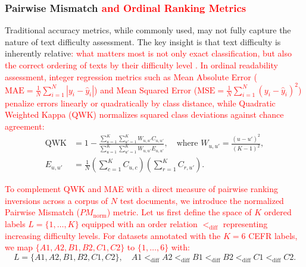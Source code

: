 \subsubsection{Pairwise Mismatch \textcolor{red}{and Ordinal Ranking Metrics}}
Traditional accuracy metrics, while commonly used, may not fully capture the nature of text difficulty assessment. The key insight is that text difficulty is inherently relative\textcolor{red}{: what matters most is not only exact classification, but also the correct ordering of texts by their difficulty level \cite{martinc2021supervised}. In ordinal readability assessment, integer regression metrics such as Mean Absolute Error ($\text{MAE} = \frac{1}{N}\sum_{i=1}^N |y_i - \hat{y}_i|$) and Mean Squared Error ($\text{MSE} = \frac{1}{N}\sum_{i=1}^N (y_i - \hat{y}_i)^2$) penalize errors linearly or quadratically by class distance, while Quadratic Weighted Kappa (QWK) \cite{martinc2021supervised} normalizes squared class deviations against chance agreement:}
{\color{red}\begin{equation}
\begin{aligned}
\text{QWK} &= 1 - \frac{\sum_{u=1}^{K}\sum_{u'=1}^{K} W_{u,u'} C_{u,u'}}{\sum_{u=1}^{K}\sum_{u'=1}^{K} W_{u,u'} E_{u,u'}}, \quad \text{where } W_{u,u'} = \frac{(u - u')^2}{(K - 1)^2}, \\
E_{u,u'} &= \frac{1}{N}\left(\sum_{c=1}^{K} C_{u,c}\right)\left(\sum_{r=1}^{K} C_{r,u'}\right).
\end{aligned}
\label{eq:qwk_definition}
\end{equation}}

\textcolor{red}{To complement QWK and MAE with a direct measure of pairwise ranking inversions across a corpus of $N$ test documents, we introduce the normalized Pairwise Mismatch ($PM_{\text{norm}}$) metric. Let us first define the space of $K$ ordered labels $L = \{1, \dots, K\}$ equipped with an order relation $<_{\text{diff}}$ representing increasing difficulty levels. For datasets annotated with the $K=6$ CEFR labels, we map $\{A1, A2, B1, B2, C1, C2\}$ to $\{1, \dots, 6\}$ with:}
{\color{red}\begin{equation}
L = \{A1, A2, B1, B2, C1, C2\}, \quad A1 <_{\text{diff}} A2 <_{\text{diff}} B1 <_{\text{diff}} B2 <_{\text{diff}} C1 <_{\text{diff}} C2.
\label{eq:cefr_order}
\end{equation}}

